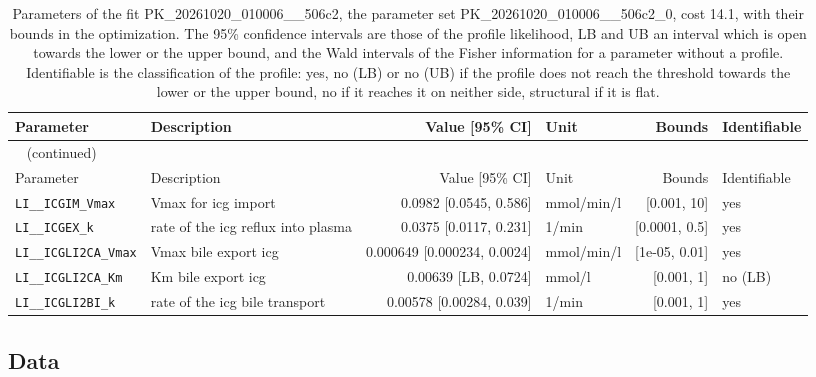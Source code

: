 \documentclass{article}
\begin{document}
\begin{longtable}{llrlrl}
\caption{Parameters of the fit PK\_20261020\_010006\_\_506c2, the parameter set PK\_20261020\_010006\_\_506c2\_0, cost 14.1, with their bounds in the optimization. The 95\% confidence intervals are those of the profile likelihood, LB and UB an interval which is open towards the lower or the upper bound, and the Wald intervals of the Fisher information for a parameter without a profile. Identifiable is the classification of the profile: yes, no (LB) or no (UB) if the profile does not reach the threshold towards the lower or the upper bound, no if it reaches it on neither side, structural if it is flat.}\label{tab:parameters:PK_20261020_010006__506c2} \\
\toprule
Parameter & Description & Value [95\% CI] & Unit & Bounds & Identifiable \\
\midrule
\endfirsthead
\multicolumn{6}{l}{\small\tablename~\thetable{} (continued)} \\
\toprule
Parameter & Description & Value [95\% CI] & Unit & Bounds & Identifiable \\
\midrule
\endhead
\bottomrule
\endlastfoot
\texttt{LI\_\_ICGIM\_Vmax} & Vmax for icg import & 0.0982 [0.0545, 0.586] & mmol/min/l & [0.001, 10] & yes \\
\texttt{LI\_\_ICGEX\_k} & rate of the icg reflux into plasma & 0.0375 [0.0117, 0.231] & 1/min & [0.0001, 0.5] & yes \\
\texttt{LI\_\_ICGLI2CA\_Vmax} & Vmax bile export icg & 0.000649 [0.000234, 0.0024] & mmol/min/l & [1e-05, 0.01] & yes \\
\texttt{LI\_\_ICGLI2CA\_Km} & Km bile export icg & 0.00639 [LB, 0.0724] & mmol/l & [0.001, 1] & no (LB) \\
\texttt{LI\_\_ICGLI2BI\_k} & rate of the icg bile transport & 0.00578 [0.00284, 0.039] & 1/min & [0.001, 1] & yes \\
\end{longtable}

\subsection{Data}
\end{document}
